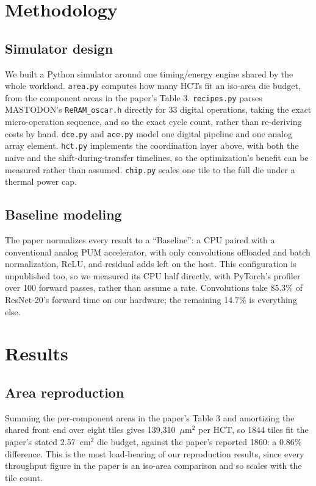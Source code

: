 \documentclass[conference]{IEEEtran}
\begin{document}
\section{Methodology}

\subsection{Simulator design}

We built a Python simulator around one timing/energy engine shared by the
whole workload. \texttt{area.py} computes how many HCTs fit an iso-area die
budget, from the component areas in the paper's Table 3.
\texttt{recipes.py} parses MASTODON's \texttt{ReRAM\_oscar.h} directly for
33 digital operations, taking the exact micro-operation sequence, and so the
exact cycle count, rather than re-deriving costs by hand. \texttt{dce.py}
and \texttt{ace.py} model one digital pipeline and one analog array
element. \texttt{hct.py} implements the coordination layer above, with both
the naive and the shift-during-transfer timelines, so the optimization's
benefit can be measured rather than assumed. \texttt{chip.py} scales one
tile to the full die under a thermal power cap.

\subsection{Baseline modeling}

The paper normalizes every result to a ``Baseline'': a CPU paired with a
conventional analog PUM accelerator, with only convolutions offloaded and
batch normalization, ReLU, and residual adds left on the host. This
configuration is unpublished too, so we measured its CPU half directly, with
PyTorch's profiler over 100 forward passes, rather than assume a rate.
Convolutions take 85.3\% of ResNet-20's forward time on our hardware; the
remaining 14.7\% is everything else.

\section{Results}

\subsection{Area reproduction}

Summing the per-component areas in the paper's Table 3 and amortizing the
shared front end over eight tiles gives 139{,}310~$\mu\text{m}^2$ per HCT,
so 1844 tiles fit the paper's stated 2.57~$\text{cm}^2$ die budget, against
the paper's reported 1860: a 0.86\% difference. This is the most
load-bearing of our reproduction results, since every throughput figure in
the paper is an iso-area comparison and so scales with the tile count.
\end{document}
